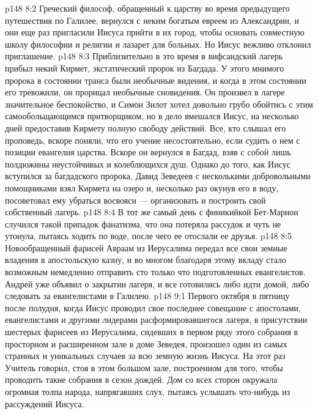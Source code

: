 \vs p148 8:2 \pc Греческий философ, обращенный к царству во время предыдущего путешествия по Галилее, вернулся с неким богатым евреем из Александрии, и они еще раз пригласили Иисуса прийти в их город, чтобы основать совместную школу философии и религии и лазарет для больных. Но Иисус вежливо отклонил приглашение.
\vs p148 8:3 \pc Приблизительно в это время в вифсаидский лагерь прибыл некий Кирмет, экстатический пророк из Багдада. У этого мнимого пророка в состоянии транса были необычные видения, и когда в этом состоянии его тревожили, он прорицал необычные сновидения. Он произвел в лагере значительное беспокойство, и Симон Зилот хотел довольно грубо обойтись с этим самообольщающимся притворщиком, но в дело вмешался Иисус, на несколько дней предоставив Кирмету полную свободу действий. Все, кто слышал его проповедь, вскоре поняли, что его учение несостоятельно, если судить о нем с позиции евангелия царства. Вскоре он вернулся в Багдад, взяв с собой лишь полдюжины неустойчивых и колеблющихся душ. Однако до того, как Иисус вступился за багдадского пророка, Давид Зеведеев с несколькими добровольными помощниками взял Кирмета на озеро и, несколько раз окунув его в воду, посоветовал ему убраться восвояси --- организовать и построить свой собственный лагерь.
\vs p148 8:4 \pc В тот же самый день с финикийкой Бет\hyp{}Марион случился такой припадок фанатизма, что она потеряла рассудок и чуть не утонула, пытаясь ходить по воде, после чего ее отослали ее друзья.
\vs p148 8:5 \pc Новообращенный фарисей Авраам из Иерусалима передал все свои земные владения в апостольскую казну, и во многом благодаря этому вкладу стало возможным немедленно отправить сто только что подготовленных евангелистов. Андрей уже объявил о закрытии лагеря, и все готовились либо идти домой, либо следовать за евангелистами в Галилею.
\vs p148 9:1 Первого октября в пятницу после полудня, когда Иисус проводил свое последнее совещание с апостолами, евангелистами и другими лидерами расформировавшегося лагеря, в присутствии шестерых фарисеев из Иерусалима, сидевших в первом ряду этого собрания в просторном и расширенном зале в доме Зеведея, произошел один из самых странных и уникальных случаев за всю земную жизнь Иисуса. На этот раз Учитель говорил, стоя в этом большом зале, построенном для того, чтобы проводить такие собрания в сезон дождей. Дом со всех сторон окружала огромная толпа народа, напрягавших слух, пытаясь услышать что\hyp{}нибудь из рассуждений Иисуса.
